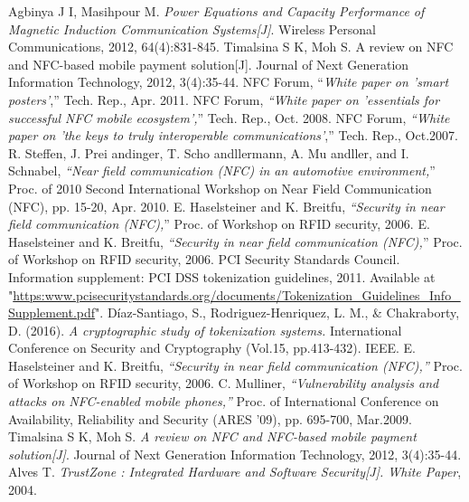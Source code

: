 \documentclass[journal]{IEEEtran}
\begin{document}
\begin{thebibliography}{1}
Agbinya J I, Masihpour M. \emph{Power Equations and Capacity Performance of Magnetic Induction Communication Systems[J]}. Wireless Personal Communications, 2012, 64(4):831-845.
Timalsina S K, Moh S. A review on NFC and NFC-based mobile payment solution[J]. Journal of Next Generation Information Technology, 2012, 3(4):35-44.
NFC Forum, “\emph{White paper on ’smart posters’},” Tech. Rep., Apr. 2011.
NFC Forum, \emph{“White paper on ’essentials for successful NFC mobile ecosystem’,}” Tech. Rep., Oct.
2008.
NFC Forum, \emph{“White paper on ’the keys to truly interoperable communications’},” Tech. Rep., Oct.2007.
R. Steffen, J. Prei andinger, T. Scho andllermann, A. Mu andller, and I. Schnabel, \emph{“Near field communication (NFC) in an automotive environment,}” Proc. of 2010 Second International Workshop on Near Field Communication (NFC), pp. 15-20, Apr. 2010.
E. Haselsteiner and K. Breitfu, \emph{“Security in near field communication (NFC),}” Proc. of Workshop on RFID security, 2006.
E. Haselsteiner and K. Breitfu, \emph{“Security in near field communication (NFC),}” Proc. of Workshop
on RFID security, 2006.
PCI Security Standards Council. Information supplement: PCI DSS tokenization guidelines, 2011. Available at "\url{https:www.pcisecuritystandards.org/documents/Tokenization_Guidelines_Info_Supplement.pdf}".
Díaz-Santiago, S., Rodriguez-Henriquez, L. M., \& Chakraborty, D. (2016). \emph{A cryptographic study of tokenization systems.} International Conference on Security and Cryptography (Vol.15, pp.413-432). IEEE.
E. Haselsteiner and K. Breitfu, \emph{“Security in near field communication (NFC),”} Proc. of Workshop on RFID security, 2006.
C. Mulliner, \emph{“Vulnerability analysis and attacks on NFC-enabled mobile phones,”} Proc. of International Conference on Availability, Reliability and Security (ARES ’09), pp. 695-700, Mar.2009.
Timalsina S K, Moh S. \emph{A review on NFC and NFC-based mobile payment solution[J]}. Journal of Next Generation Information Technology, 2012, 3(4):35-44.
Alves T. \emph{TrustZone : Integrated Hardware and Software Security[J]. White Paper}, 2004.

\end{thebibliography}
\end{document}
